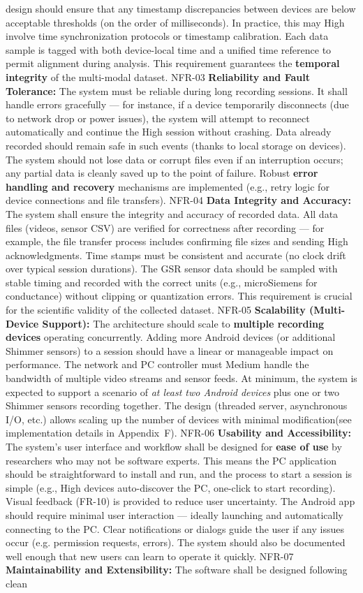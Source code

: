 design should ensure that any timestamp discrepancies between devices are below acceptable thresholds (on the order of milliseconds). In practice, this may High involve time synchronization protocols or timestamp calibration. Each data sample is tagged with both device-local time and a unified time reference to permit alignment during analysis. This requirement guarantees the \textbf{temporal integrity} of the multi-modal dataset. NFR-03 \textbf{Reliability and Fault Tolerance:} The system must be reliable during long recording sessions. It shall handle errors gracefully --- for instance, if a device temporarily disconnects (due to network drop or power issues), the system will attempt to reconnect automatically and continue the High session without crashing. Data already recorded should remain safe in such events (thanks to local storage on devices). The system should not lose data or corrupt files even if an interruption occurs; any partial data is cleanly saved up to the point of failure. Robust \textbf{error handling and recovery} mechanisms are implemented (e.g., retry logic for device connections and file transfers). NFR-04 \textbf{Data Integrity and Accuracy:} The system shall ensure the integrity and accuracy of recorded data. All data files (videos, sensor CSV) are verified for correctness after recording --- for example, the file transfer process includes confirming file sizes and sending High acknowledgments. Time stamps must be consistent and accurate (no clock drift over typical session durations). The GSR sensor data should be sampled with stable timing and recorded with the correct units (e.g., microSiemens for conductance) without clipping or quantization errors. This requirement is crucial for the scientific validity of the collected dataset. NFR-05 \textbf{Scalability (Multi-Device Support):} The architecture should scale to \textbf{multiple recording devices} operating concurrently. Adding more Android devices (or additional Shimmer sensors) to a session should have a linear or manageable impact on performance. The network and PC controller must Medium handle the bandwidth of multiple video streams and sensor feeds. At minimum, the system is expected to support a scenario of \textit{at least two Android devices} plus one or two Shimmer sensors recording together. The design (threaded server, asynchronous I/O, etc.) allows scaling up the number of devices with minimal modification(see implementation details in Appendix~F). NFR-06 \textbf{Usability and Accessibility:} The system's user interface and workflow shall be designed for \textbf{ease of use} by researchers who may not be software experts. This means the PC application should be straightforward to install and run, and the process to start a session is simple (e.g., High devices auto-discover the PC, one-click to start recording). Visual feedback (FR-10) is provided to reduce user uncertainty. The Android app should require minimal user interaction --- ideally launching and automatically connecting to the PC. Clear notifications or dialogs guide the user if any issues occur (e.g. permission requests, errors). The system should also be documented well enough that new users can learn to operate it quickly. NFR-07 \textbf{Maintainability and Extensibility:} The software shall be designed following clean 